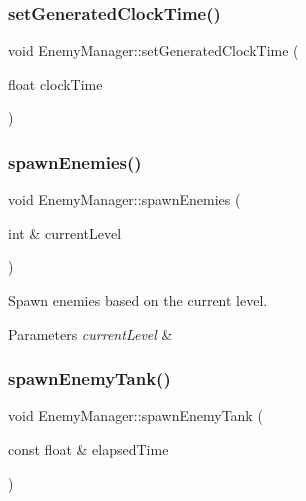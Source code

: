 \mbox{\label{class_enemy_manager_a6258b25ccc4866129f9bfe176ee22c1f}} 
\subsubsection{\texorpdfstring{set\+Generated\+Clock\+Time()}{setGeneratedClockTime()}}
{\footnotesize\ttfamily void Enemy\+Manager\+::set\+Generated\+Clock\+Time (\begin{DoxyParamCaption}\item[{float}]{clock\+Time }\end{DoxyParamCaption})\hspace{0.3cm}{\ttfamily [inline]}}

\mbox{\label{class_enemy_manager_a37036db8aad73493103815dc45c6339d}} 
\subsubsection{\texorpdfstring{spawn\+Enemies()}{spawnEnemies()}}
{\footnotesize\ttfamily void Enemy\+Manager\+::spawn\+Enemies (\begin{DoxyParamCaption}\item[{int \&}]{current\+Level }\end{DoxyParamCaption})}



Spawn enemies based on the current level. 


\begin{DoxyParams}{Parameters}
{\em current\+Level} & \\
\hline
\end{DoxyParams}
\mbox{\label{class_enemy_manager_aecc9136f37db0fb4ce451c3849ecde5d}} 
\subsubsection{\texorpdfstring{spawn\+Enemy\+Tank()}{spawnEnemyTank()}}
{\footnotesize\ttfamily void Enemy\+Manager\+::spawn\+Enemy\+Tank (\begin{DoxyParamCaption}\item[{const float \&}]{elapsed\+Time }\end{DoxyParamCaption})\hspace{0.3cm}{\ttfamily [private]}}

